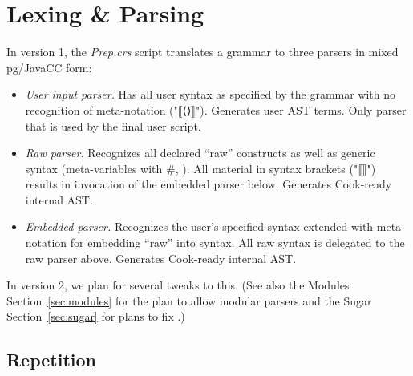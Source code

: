 \documentclass[11pt]{article} %
\begin{document}
\section{Lexing \& Parsing}\label{sec:parsing}

In version 1, the \emph{Prep.crs} script translates a grammar to three parsers in mixed pg/JavaCC
form:
\begin{itemize}

\item\emph{User input parser.} Has all user syntax as specified by the grammar with no recognition
  of \HAX meta-notation ("⟦⟨⟩⟧"). Generates user AST terms. Only parser that is used by the final
  user script.

\item\emph{Raw parser.} Recognizes all declared ``raw'' constructs as well as generic \HAX syntax
  (meta-variables with \#, \etc). All material in syntax brackets ("⟦⟧") results in invocation of
  the embedded parser below. Generates Cook-ready internal \HAX AST.

\item\emph{Embedded parser.} Recognizes the user's specified syntax extended with \HAX meta-notation
  for embedding ``raw'' \HAX into syntax. All raw syntax is delegated to the raw parser
  above. Generates Cook-ready internal \HAX AST.

\end{itemize}
In version 2, we plan for several tweaks to this. (See also the Modules Section~\ref{sec:modules}
for the plan to allow modular parsers and the Sugar Section~\ref{sec:sugar} for plans to fix
.)

\subsection{Repetition}
\end{document}
